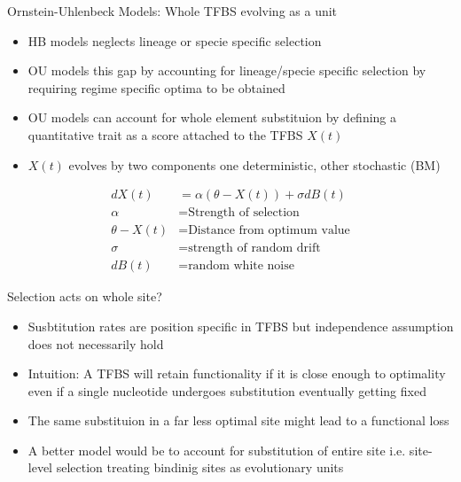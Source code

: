 \documentclass[10pt]{beamer}
\begin{document}
\begin{frame}[fragile]{Ornstein-Uhlenbeck Models: Whole TFBS evolving as a unit}
\begin{itemize}
\item HB models neglects lineage or specie specific selection
\item OU models this gap by accounting for lineage/specie specific selection by requiring regime specific optima to be obtained
\item OU models can account for whole element substituion by defining a quantitative trait as a score attached to the TFBS $X(t)$
\item $X(t)$ evolves by two components one deterministic, other stochastic (BM)
\end{itemize}
\begin{align*}
dX(t) &= \alpha(\theta-X(t)) + \sigma dB(t)\\
\alpha & = \text{Strength of selection}\\
\theta - X(t) & = \text{Distance from optimum value}\\
\sigma &= \text{strength of random drift}\\
dB(t) &= \text{random white noise}
\end{align*}
\end{frame}


\begin{frame}[fragile]{Selection acts on whole site?}
\begin{itemize}
\item Susbtitution rates are position specific in TFBS but independence assumption does not necessarily hold
\item Intuition: A TFBS will retain functionality if it is close enough to optimality even if a single nucleotide undergoes substitution eventually getting fixed
\item The same substituion in a far less optimal site might lead to a functional loss
\item A better model would be to account for substitution of entire site i.e. site-level selection treating bindinig sites as evolutionary units
\end{itemize}
\end{frame}
\end{document}
